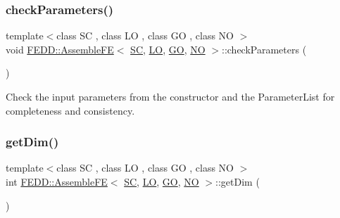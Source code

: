 \mbox{\label{classFEDD_1_1AssembleFE_a9d471f89532703a619e8a1545cab4602}} 
\subsubsection{\texorpdfstring{check\+Parameters()}{checkParameters()}}
{\footnotesize\ttfamily template$<$class SC , class LO , class GO , class NO $>$ \\
void \hyperlink{classFEDD_1_1AssembleFE}{F\+E\+D\+D\+::\+Assemble\+FE}$<$ \hyperlink{fe__test__laplace_8cpp_a79c7e86a57edbb2a5a53242bcd04e41e}{SC}, \hyperlink{fe__test__laplace_8cpp_ad6a38c9f07d3fd633eefca5bccad8410}{LO}, \hyperlink{fe__test__laplace_8cpp_afa2946b509009b4f45eb04bd8c5b27d9}{GO}, \hyperlink{fe__test__laplace_8cpp_a5e24f37b28787429872b6ecb1d0417ce}{NO} $>$\+::check\+Parameters (\begin{DoxyParamCaption}{ }\end{DoxyParamCaption})\hspace{0.3cm}{\ttfamily [virtual]}}



Check the input parameters from the constructor and the Parameter\+List for completeness and consistency. 

\mbox{\label{classFEDD_1_1AssembleFE_a35ada89164c74b433340733c01f30f4b}} 
\subsubsection{\texorpdfstring{get\+Dim()}{getDim()}}
{\footnotesize\ttfamily template$<$class SC , class LO , class GO , class NO $>$ \\
int \hyperlink{classFEDD_1_1AssembleFE}{F\+E\+D\+D\+::\+Assemble\+FE}$<$ \hyperlink{fe__test__laplace_8cpp_a79c7e86a57edbb2a5a53242bcd04e41e}{SC}, \hyperlink{fe__test__laplace_8cpp_ad6a38c9f07d3fd633eefca5bccad8410}{LO}, \hyperlink{fe__test__laplace_8cpp_afa2946b509009b4f45eb04bd8c5b27d9}{GO}, \hyperlink{fe__test__laplace_8cpp_a5e24f37b28787429872b6ecb1d0417ce}{NO} $>$\+::get\+Dim (\begin{DoxyParamCaption}{ }\end{DoxyParamCaption})}



